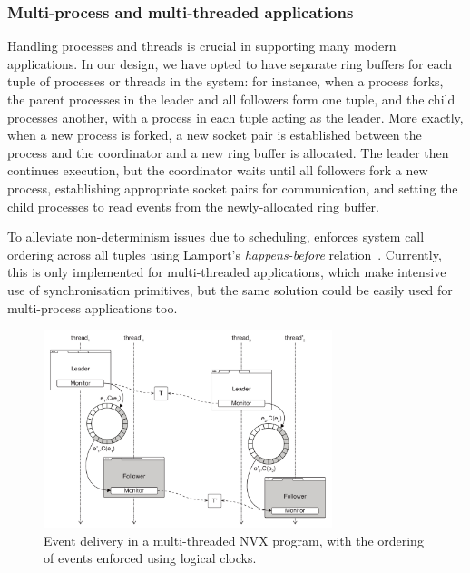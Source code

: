 

\subsubsection{Multi-process and multi-threaded applications}
\label{sec:threading}
\label{sec:ipc}

Handling processes and threads is crucial in supporting many modern
applications.  
In our design, we have opted to have separate ring buffers for each
tuple of processes or threads in the system: for instance, when a
process forks, the parent processes in the leader and all followers
form one tuple, and the child processes another, with a process in
each tuple acting as the leader.  More exactly, when a new process is
forked, a new socket pair is established between the process and the
coordinator and a new ring buffer is allocated.  The leader then
continues execution, but the coordinator waits until all followers
fork a new process, establishing appropriate socket pairs for
communication, and setting the child processes to read events from the
newly-allocated ring buffer.

To alleviate non-determinism issues due to scheduling, \varan enforces
system call ordering across all tuples using Lamport's
\emph{happens-before} relation~\cite{lamport78}. Currently, this is
only implemented for multi-threaded applications, which make intensive
use of synchronisation primitives, but the same solution could be
easily used for multi-process applications too.

\begin{figure}[t]
  \begin{center}
    \includegraphics[width=0.75\textwidth]{efficient-execution/figures/multithreading}
    \caption{Event delivery in a multi-threaded NVX program, with
      the ordering of events enforced using logical clocks.}
    \label{fig:multithreaded}
  \end{center}
\end{figure}

